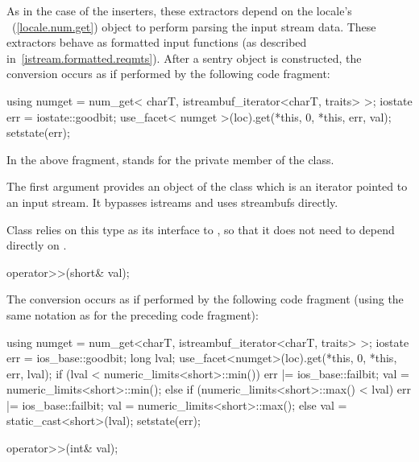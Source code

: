 \begin{itemdescr}
\pnum
As in the case of the inserters, these extractors depend on the
locale's
~(\ref{locale.num.get}) object to perform parsing the input
stream data.
These extractors behave as formatted input functions (as described in~\ref{istream.formatted.reqmts}).  After a sentry object is constructed, the
conversion occurs as if performed by the following code fragment:

\begin{codeblock}
using numget = num_get< charT, istreambuf_iterator<charT, traits> >;
iostate err = iostate::goodbit;
use_facet< numget >(loc).get(*this, 0, *this, err, val);
setstate(err);
\end{codeblock}

In the above fragment,
stands for the private member of the
class.
\begin{note}
The first argument provides an object of the
class which is an iterator pointed to an input stream.
It bypasses istreams and uses streambufs directly.
\end{note}
Class
relies on this
type as its interface to
,
so that it does not need to depend directly on
.
\end{itemdescr}

%
\begin{itemdecl}
operator>>(short& val);
\end{itemdecl}

\begin{itemdescr}
\pnum
The conversion occurs as if performed by the following code fragment
(using the same notation as for the preceding code fragment):
\begin{codeblock}
using numget = num_get<charT, istreambuf_iterator<charT, traits> >;
iostate err = ios_base::goodbit;
long lval;
use_facet<numget>(loc).get(*this, 0, *this, err, lval);
if (lval < numeric_limits<short>::min()) {
  err |= ios_base::failbit;
  val = numeric_limits<short>::min();
} else if (numeric_limits<short>::max() < lval) {
  err |= ios_base::failbit;
  val = numeric_limits<short>::max();
}  else
  val = static_cast<short>(lval);
setstate(err);
\end{codeblock}
\end{itemdescr}

%
\begin{itemdecl}
operator>>(int& val);
\end{itemdecl}

